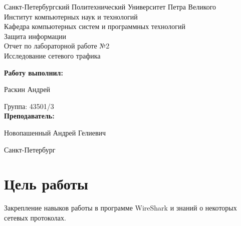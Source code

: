 \documentclass[a4paper, 14pt,russian]{article}
\begin{document}
\begin{titlepage} %

\begin{center} %

\large Санкт-Петербургский Политехнический Университет Петра Великого\\
\large Институт компьютерных наук и технологий \\
\large Кафедра компьютерных систем и программных технологий\\[6cm]

\huge Защита информации\\[0.5cm] %
\large Отчет по лабораторной работе №2\\[0.1cm]
\large Исследование сетевого трафика\\[5cm]
\end{center}

\begin{flushright}
\begin{minipage}{0.5\textwidth}
\begin{flushright}
\textbf{Работу выполнил:}

Раскин Андрей

{Группа:} 43501/3\\


\textbf{Преподаватель:} 

Новопашенный Андрей Гелиевич 
\end{flushright}
\end{minipage} %
\end{flushright} %

\vfill %

\begin{center}

\large Санкт-Петербург\\
\large \the\year %

\end{center} %

\thispagestyle{empty} %
\end{titlepage} %

\vfill %

\section{Цель работы}
Закрепление навыков работы в программе WireShark и знаний о некоторых сетевых протоколах. 
\end{document}
